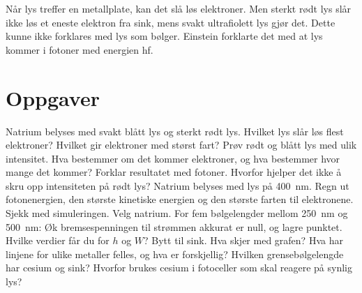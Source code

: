 \documentclass[11pt]{article}
\begin{document}

Når lys treffer en metallplate, kan det slå løs elektroner. Men sterkt rødt lys slår ikke løs et eneste elektron fra sink, mens svakt ultrafiolett lys gjør det. Dette kunne ikke forklares med lys som bølger. Einstein forklarte det med at lys kommer i fotoner med energien hf.

\section*{Oppgaver}

\begin{oppgaveliste}
\oppgave {}Natrium belyses med svakt blått lys og sterkt rødt lys. Hvilket lys slår løs flest elektroner? Hvilket gir elektroner med størst fart?
\svar
\oppgave {}Prøv rødt og blått lys med ulik intensitet. Hva bestemmer om det kommer elektroner, og hva bestemmer hvor mange det kommer?
\svar
\oppgave {}Forklar resultatet med fotoner. Hvorfor hjelper det ikke å skru opp intensiteten på rødt lys?
\svar
\oppgave {}Natrium belyses med lys på 400~nm. Regn ut fotonenergien, den største kinetiske energien og den største farten til elektronene. Sjekk med simuleringen.
\svar
\oppgave {}Velg natrium. For fem bølgelengder mellom 250~nm og 500~nm: Øk bremsespenningen til strømmen akkurat er null, og lagre punktet. Hvilke verdier får du for $h$ og $W$?
\svar
\oppgave {}Bytt til sink. Hva skjer med grafen? Hva har linjene for ulike metaller felles, og hva er forskjellig?
\svar
\oppgave {}Hvilken grensebølgelengde har cesium og sink? Hvorfor brukes cesium i fotoceller som skal reagere på synlig lys?
\svar
\end{oppgaveliste}
\end{document}
